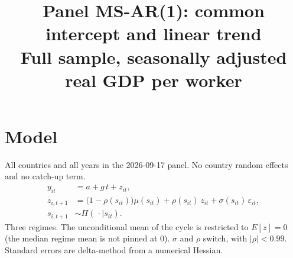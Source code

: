 \documentclass[11pt]{article}
\title{Panel MS-AR(1): common intercept and linear trend\\[0.4em]\large Full sample, seasonally adjusted real GDP per worker}
\author{}
\date{}
\begin{document}
\maketitle
\section{Model}
All countries and all years in the 2026-09-17 panel. No country random effects and no catch-up term.
\begin{align}
y_{it} &= a + g\, t + z_{it}, \\
z_{i,t+1} &= \bigl(1-\rho(s_{it})\bigr)\mu(s_{it}) + \rho(s_{it})\, z_{it} + \sigma(s_{it})\,\varepsilon_{it}, \\
s_{i,t+1} &\sim \Pi(\,\cdot\mid s_{it}).
\end{align}
Three regimes. The unconditional mean of the cycle is restricted to $E[z]=0$ (the median regime mean is not pinned at 0). $\sigma$ and $\rho$ switch, with $|\rho|<0.99$. Standard errors are delta-method from a numerical Hessian.
\clearpage
\end{document}
